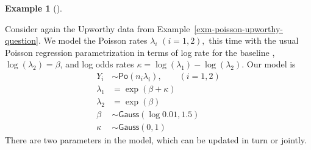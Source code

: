 \documentclass[
  11pt,
  letterpaper,
]{scrbook}
\theoremstyle{definition}
\theoremstyle{definition}
\newtheorem{example}{Example}[chapter]
\theoremstyle{definition}
\theoremstyle{plain}
\theoremstyle{plain}
\theoremstyle{remark}
\begin{document}
\begin{example}[]\protect\hypertarget{exm-upworthy-question}{}\label{exm-upworthy-question}

Consider again the Upworthy data from
Example~\ref{exm-poisson-upworthy-question}. We model the Poisson rates
\(\lambda_i\) \((i=1,2),\) this time with the usual Poisson regression
parametrization in terms of log rate for the baseline ,
\(\log(\lambda_2) = \beta\), and log odds rates
\(\kappa = \log(\lambda_1) - \log(\lambda_2)\). Our model is
\begin{align*}
Y_{i} &\sim \mathsf{Po}(n_i\lambda_i), \qquad (i=1,2)\\
\lambda_1 &= \exp(\beta + \kappa) \\
\lambda_2 &= \exp(\beta) \\
\beta & \sim \mathsf{Gauss}(\log 0.01, 1.5) \\
\kappa &\sim \mathsf{Gauss}(0, 1)
\end{align*} There are two parameters in the model, which can be updated
in turn or jointly.


\end{example}
\end{document}

